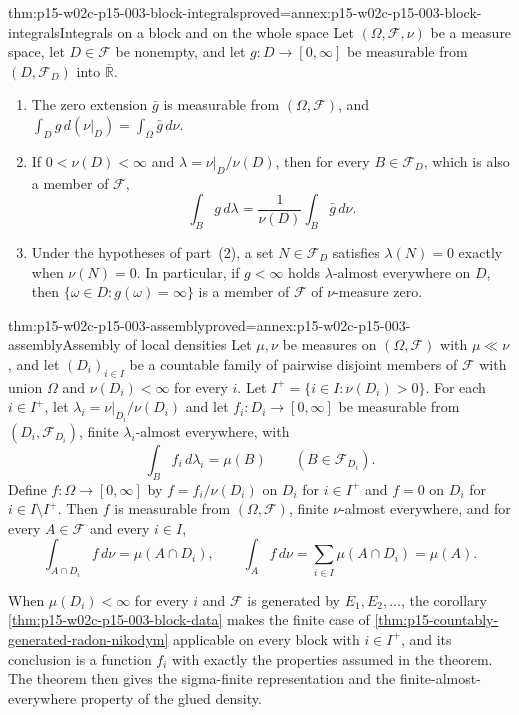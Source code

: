\begin{hblemma}{thm:p15-w02c-p15-003-block-integrals}{proved=annex:p15-w02c-p15-003-block-integrals}{Integrals on a block and on the whole space}
Let \((\Omega,\mathcal F,\nu)\) be a measure space, let
\(D\in\mathcal F\) be nonempty, and let \(g:D\to[0,\infty]\) be
measurable from \((D,\mathcal F_D)\) into \(\overline{\mathbb R}\).
\begin{enumerate}
\item The zero extension \(\bar g\) is measurable from
      \((\Omega,\mathcal F)\), and
      \(\int_Dg\,d(\nu|_D)=\int_\Omega\bar g\,d\nu\).
\item If \(0<\nu(D)<\infty\) and \(\lambda=\nu|_D/\nu(D)\), then for
      every \(B\in\mathcal F_D\), which is also a member of
      \(\mathcal F\),
      \[
       \int_Bg\,d\lambda=\frac1{\nu(D)}\int_B\bar g\,d\nu .
      \]
\item Under the hypotheses of part~(2), a set \(N\in\mathcal F_D\)
      satisfies \(\lambda(N)=0\) exactly when \(\nu(N)=0\). In
      particular, if \(g<\infty\) holds \(\lambda\)-almost everywhere on
      \(D\), then \(\{\omega\in D:g(\omega)=\infty\}\) is a member of
      \(\mathcal F\) of \(\nu\)-measure zero.
\end{enumerate}
\end{hblemma}

\begin{hbtheorem}{thm:p15-w02c-p15-003-assembly}{proved=annex:p15-w02c-p15-003-assembly}{Assembly of local densities}
Let \(\mu,\nu\) be measures on \((\Omega,\mathcal F)\) with \(\mu\ll\nu\),
and let \((D_i)_{i\in I}\) be a countable family of pairwise disjoint
members of \(\mathcal F\) with union \(\Omega\) and \(\nu(D_i)<\infty\)
for every \(i\). Let \(I^+=\{i\in I:\nu(D_i)>0\}\). For each
\(i\in I^+\), let \(\lambda_i=\nu|_{D_i}/\nu(D_i)\) and let
\(f_i:D_i\to[0,\infty]\) be measurable from \((D_i,\mathcal F_{D_i})\),
finite \(\lambda_i\)-almost everywhere, with
\[
 \int_Bf_i\,d\lambda_i=\mu(B)\qquad(B\in\mathcal F_{D_i}).
\]
Define \(f:\Omega\to[0,\infty]\) by \(f=f_i/\nu(D_i)\) on \(D_i\) for
\(i\in I^+\) and \(f=0\) on \(D_i\) for \(i\in I\setminus I^+\). Then
\(f\) is measurable from \((\Omega,\mathcal F)\), finite
\(\nu\)-almost everywhere, and for every \(A\in\mathcal F\) and every
\(i\in I\),
\[
 \int_{A\cap D_i}f\,d\nu=\mu(A\cap D_i),
 \qquad
 \int_Af\,d\nu=\sum_{i\in I}\mu(A\cap D_i)=\mu(A).
\]
\end{hbtheorem}

When \(\mu(D_i)<\infty\) for every \(i\) and \(\mathcal F\) is generated
by \(E_1,E_2,\ldots\), the corollary \cref{thm:p15-w02c-p15-003-block-data}
makes the finite case of \cref{thm:p15-countably-generated-radon-nikodym}
applicable on every block with \(i\in I^+\), and its conclusion is a
function \(f_i\) with exactly the properties assumed in the theorem. The
theorem then gives the sigma-finite representation and the
finite-almost-everywhere property of the glued density.

